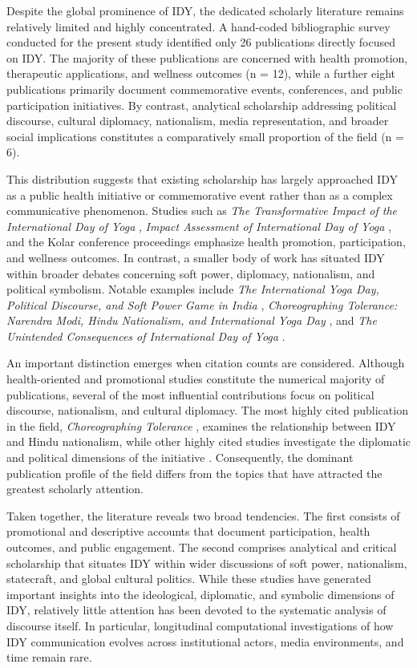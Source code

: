 \documentclass[11pt]{article}
\begin{document}
Despite the global prominence of IDY, the dedicated scholarly literature remains relatively limited and highly
concentrated. A hand-coded bibliographic survey conducted for the present study identified only 26 publications directly
focused on IDY. The majority of these publications are concerned with health promotion, therapeutic applications, and
wellness outcomes (n = 12), while a further eight publications primarily document commemorative events, conferences, and
public participation initiatives. By contrast, analytical scholarship addressing political discourse, cultural
diplomacy, nationalism, media representation, and broader social implications constitutes a comparatively small
proportion of the field (n = 6).


This distribution suggests that existing scholarship has largely approached IDY as a public health initiative or
commemorative event rather than as a complex communicative phenomenon. Studies such as \textit{The Transformative Impact
of the International Day of Yoga} \citep{transformative2023}, \textit{Impact Assessment of International Day of Yoga}
\citep{impact2024}, and the Kolar conference proceedings \citep{kolar2015, kolar2016} emphasize health promotion,
participation, and wellness outcomes. In contrast, a smaller body of work has situated IDY within broader debates
concerning soft power, diplomacy, nationalism, and political symbolism. Notable examples include \textit{The
International Yoga Day, Political Discourse, and Soft Power Game in India} \citep{softpower2020}, \textit{Choreographing
Tolerance: Narendra Modi, Hindu Nationalism, and International Yoga Day} \citep{choreographing2020}, and \textit{The
Unintended Consequences of International Day of Yoga} \citep{unintended2018}.


An important distinction emerges when citation counts are considered. Although health-oriented and promotional studies
constitute the numerical majority of publications, several of the most influential contributions focus on political
discourse, nationalism, and cultural diplomacy. The most highly cited publication in the field, \textit{Choreographing
Tolerance} \citep{choreographing2020}, examines the relationship between IDY and Hindu nationalism, while other highly
cited studies investigate the diplomatic and political dimensions of the initiative \citep{softpower2020,
unintended2018}. Consequently, the dominant publication profile of the field differs from the topics that have attracted
the greatest scholarly attention.


Taken together, the literature reveals two broad tendencies. The first consists of promotional and descriptive accounts
that document participation, health outcomes, and public engagement. The second comprises analytical and critical
scholarship that situates IDY within wider discussions of soft power, nationalism, statecraft, and global cultural
politics. While these studies have generated important insights into the ideological, diplomatic, and symbolic
dimensions of IDY, relatively little attention has been devoted to the systematic analysis of discourse itself. In
particular, longitudinal computational investigations of how IDY communication evolves across institutional actors,
media environments, and time remain rare.
\end{document}
